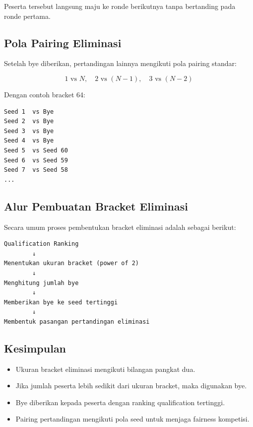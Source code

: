 Peserta tersebut langsung maju ke ronde berikutnya tanpa bertanding pada ronde pertama.

\subsection{Pola Pairing Eliminasi}

Setelah bye diberikan, pertandingan lainnya mengikuti pola pairing standar:

\[
1 \text{ vs } N, \quad 2 \text{ vs } (N-1), \quad 3 \text{ vs } (N-2)
\]

Dengan contoh bracket 64:

\begin{verbatim}
Seed 1  vs Bye
Seed 2  vs Bye
Seed 3  vs Bye
Seed 4  vs Bye
Seed 5  vs Seed 60
Seed 6  vs Seed 59
Seed 7  vs Seed 58
...
\end{verbatim}

\subsection{Alur Pembuatan Bracket Eliminasi}

Secara umum proses pembentukan bracket eliminasi adalah sebagai berikut:

\begin{verbatim}
Qualification Ranking
        ↓
Menentukan ukuran bracket (power of 2)
        ↓
Menghitung jumlah bye
        ↓
Memberikan bye ke seed tertinggi
        ↓
Membentuk pasangan pertandingan eliminasi
\end{verbatim}

\subsection{Kesimpulan}

\begin{itemize}
\item Ukuran bracket eliminasi mengikuti bilangan pangkat dua.
\item Jika jumlah peserta lebih sedikit dari ukuran bracket, maka digunakan bye.
\item Bye diberikan kepada peserta dengan ranking qualification tertinggi.
\item Pairing pertandingan mengikuti pola seed untuk menjaga fairness kompetisi.
\end{itemize}